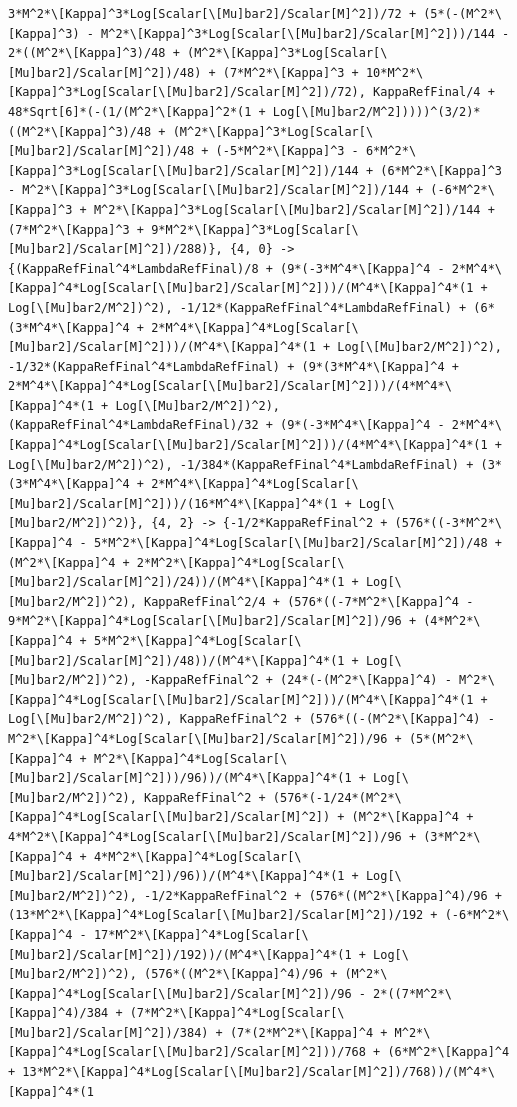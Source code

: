 \documentclass[11pt]{article}
\begin{document}
\begin{verbatim}
3*M^2*\[Kappa]^3*Log[Scalar[\[Mu]bar2]/Scalar[M]^2])/72 + (5*(-(M^2*\[Kappa]^3) - M^2*\[Kappa]^3*Log[Scalar[\[Mu]bar2]/Scalar[M]^2]))/144 - 2*((M^2*\[Kappa]^3)/48 + (M^2*\[Kappa]^3*Log[Scalar[\[Mu]bar2]/Scalar[M]^2])/48) + (7*M^2*\[Kappa]^3 + 10*M^2*\[Kappa]^3*Log[Scalar[\[Mu]bar2]/Scalar[M]^2])/72), KappaRefFinal/4 + 48*Sqrt[6]*(-(1/(M^2*\[Kappa]^2*(1 + Log[\[Mu]bar2/M^2]))))^(3/2)*((M^2*\[Kappa]^3)/48 + (M^2*\[Kappa]^3*Log[Scalar[\[Mu]bar2]/Scalar[M]^2])/48 + (-5*M^2*\[Kappa]^3 - 6*M^2*\[Kappa]^3*Log[Scalar[\[Mu]bar2]/Scalar[M]^2])/144 + (6*M^2*\[Kappa]^3 - M^2*\[Kappa]^3*Log[Scalar[\[Mu]bar2]/Scalar[M]^2])/144 + (-6*M^2*\[Kappa]^3 + M^2*\[Kappa]^3*Log[Scalar[\[Mu]bar2]/Scalar[M]^2])/144 + (7*M^2*\[Kappa]^3 + 9*M^2*\[Kappa]^3*Log[Scalar[\[Mu]bar2]/Scalar[M]^2])/288)}, {4, 0} -> {(KappaRefFinal^4*LambdaRefFinal)/8 + (9*(-3*M^4*\[Kappa]^4 - 2*M^4*\[Kappa]^4*Log[Scalar[\[Mu]bar2]/Scalar[M]^2]))/(M^4*\[Kappa]^4*(1 + Log[\[Mu]bar2/M^2])^2), -1/12*(KappaRefFinal^4*LambdaRefFinal) + (6*(3*M^4*\[Kappa]^4 + 2*M^4*\[Kappa]^4*Log[Scalar[\[Mu]bar2]/Scalar[M]^2]))/(M^4*\[Kappa]^4*(1 + Log[\[Mu]bar2/M^2])^2), -1/32*(KappaRefFinal^4*LambdaRefFinal) + (9*(3*M^4*\[Kappa]^4 + 2*M^4*\[Kappa]^4*Log[Scalar[\[Mu]bar2]/Scalar[M]^2]))/(4*M^4*\[Kappa]^4*(1 + Log[\[Mu]bar2/M^2])^2), (KappaRefFinal^4*LambdaRefFinal)/32 + (9*(-3*M^4*\[Kappa]^4 - 2*M^4*\[Kappa]^4*Log[Scalar[\[Mu]bar2]/Scalar[M]^2]))/(4*M^4*\[Kappa]^4*(1 + Log[\[Mu]bar2/M^2])^2), -1/384*(KappaRefFinal^4*LambdaRefFinal) + (3*(3*M^4*\[Kappa]^4 + 2*M^4*\[Kappa]^4*Log[Scalar[\[Mu]bar2]/Scalar[M]^2]))/(16*M^4*\[Kappa]^4*(1 + Log[\[Mu]bar2/M^2])^2)}, {4, 2} -> {-1/2*KappaRefFinal^2 + (576*((-3*M^2*\[Kappa]^4 - 5*M^2*\[Kappa]^4*Log[Scalar[\[Mu]bar2]/Scalar[M]^2])/48 + (M^2*\[Kappa]^4 + 2*M^2*\[Kappa]^4*Log[Scalar[\[Mu]bar2]/Scalar[M]^2])/24))/(M^4*\[Kappa]^4*(1 + Log[\[Mu]bar2/M^2])^2), KappaRefFinal^2/4 + (576*((-7*M^2*\[Kappa]^4 - 9*M^2*\[Kappa]^4*Log[Scalar[\[Mu]bar2]/Scalar[M]^2])/96 + (4*M^2*\[Kappa]^4 + 5*M^2*\[Kappa]^4*Log[Scalar[\[Mu]bar2]/Scalar[M]^2])/48))/(M^4*\[Kappa]^4*(1 + Log[\[Mu]bar2/M^2])^2), -KappaRefFinal^2 + (24*(-(M^2*\[Kappa]^4) - M^2*\[Kappa]^4*Log[Scalar[\[Mu]bar2]/Scalar[M]^2]))/(M^4*\[Kappa]^4*(1 + Log[\[Mu]bar2/M^2])^2), KappaRefFinal^2 + (576*((-(M^2*\[Kappa]^4) - M^2*\[Kappa]^4*Log[Scalar[\[Mu]bar2]/Scalar[M]^2])/96 + (5*(M^2*\[Kappa]^4 + M^2*\[Kappa]^4*Log[Scalar[\[Mu]bar2]/Scalar[M]^2]))/96))/(M^4*\[Kappa]^4*(1 + Log[\[Mu]bar2/M^2])^2), KappaRefFinal^2 + (576*(-1/24*(M^2*\[Kappa]^4*Log[Scalar[\[Mu]bar2]/Scalar[M]^2]) + (M^2*\[Kappa]^4 + 4*M^2*\[Kappa]^4*Log[Scalar[\[Mu]bar2]/Scalar[M]^2])/96 + (3*M^2*\[Kappa]^4 + 4*M^2*\[Kappa]^4*Log[Scalar[\[Mu]bar2]/Scalar[M]^2])/96))/(M^4*\[Kappa]^4*(1 + Log[\[Mu]bar2/M^2])^2), -1/2*KappaRefFinal^2 + (576*((M^2*\[Kappa]^4)/96 + (13*M^2*\[Kappa]^4*Log[Scalar[\[Mu]bar2]/Scalar[M]^2])/192 + (-6*M^2*\[Kappa]^4 - 17*M^2*\[Kappa]^4*Log[Scalar[\[Mu]bar2]/Scalar[M]^2])/192))/(M^4*\[Kappa]^4*(1 + Log[\[Mu]bar2/M^2])^2), (576*((M^2*\[Kappa]^4)/96 + (M^2*\[Kappa]^4*Log[Scalar[\[Mu]bar2]/Scalar[M]^2])/96 - 2*((7*M^2*\[Kappa]^4)/384 + (7*M^2*\[Kappa]^4*Log[Scalar[\[Mu]bar2]/Scalar[M]^2])/384) + (7*(2*M^2*\[Kappa]^4 + M^2*\[Kappa]^4*Log[Scalar[\[Mu]bar2]/Scalar[M]^2]))/768 + (6*M^2*\[Kappa]^4 + 13*M^2*\[Kappa]^4*Log[Scalar[\[Mu]bar2]/Scalar[M]^2])/768))/(M^4*\[Kappa]^4*(1 
\end{verbatim}
\end{document}
